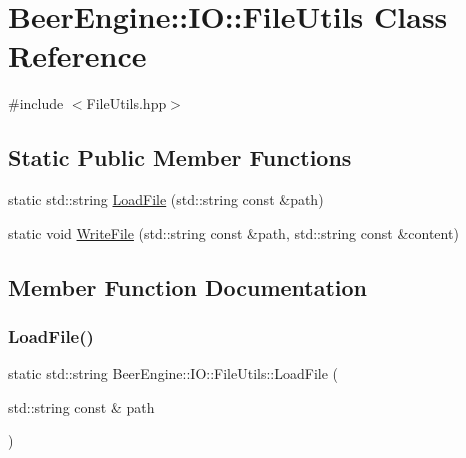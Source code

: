 \hypertarget{class_beer_engine_1_1_i_o_1_1_file_utils}{}\section{Beer\+Engine\+:\+:IO\+:\+:File\+Utils Class Reference}
\label{class_beer_engine_1_1_i_o_1_1_file_utils}


{\ttfamily \#include $<$File\+Utils.\+hpp$>$}

\subsection*{Static Public Member Functions}
\begin{DoxyCompactItemize}
\item 
static std\+::string \mbox{\hyperlink{class_beer_engine_1_1_i_o_1_1_file_utils_a42d1afff6c3454c1ff4aa6b691a1c963}{Load\+File}} (std\+::string const \&path)
\item 
static void \mbox{\hyperlink{class_beer_engine_1_1_i_o_1_1_file_utils_ac58ded74238ff6180e72e4b2f0be6b81}{Write\+File}} (std\+::string const \&path, std\+::string const \&content)
\end{DoxyCompactItemize}


\subsection{Member Function Documentation}
\mbox{\label{class_beer_engine_1_1_i_o_1_1_file_utils_a42d1afff6c3454c1ff4aa6b691a1c963}} 
\subsubsection{\texorpdfstring{Load\+File()}{LoadFile()}}
{\footnotesize\ttfamily static std\+::string Beer\+Engine\+::\+I\+O\+::\+File\+Utils\+::\+Load\+File (\begin{DoxyParamCaption}\item[{std\+::string const \&}]{path }\end{DoxyParamCaption})\hspace{0.3cm}{\ttfamily [static]}}

